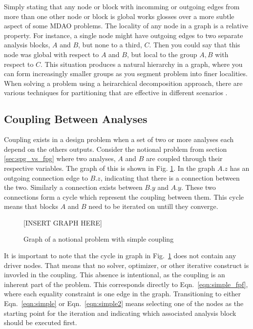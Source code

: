   Simply stating that any node or block with incomming or outgoing edges
  from more than one other node or block is global works glosses over a more 
  subtle aspect of some MDAO problems. The locality of any node in a graph is 
  a relative property. For instance, a single node might have outgoing edges 
  to two separate analysis blocks, $A$ and $B$, but none to a third, $C$. Then 
  you could say that this node was global with respect to $A$ and $B$, but local 
  to the group $A,B$ with respect to $C$. This situation produces a natural 
  hierarchy in a graph, where you can form increasingly smaller groups as you 
  segment problem into finer localities. When solving a problem using 
  a heirarchical decomposition approach, there are various techniques for 
  partitioning that are effective in different scenarios 
  \cite{krishnamachari1997optimal,Perez2004,sobieszczanski1997,allison2009optimal,michelena1997hypergraph}. 

\subsection{Coupling Between Analyses}

  Coupling exists in a design problem when a set of two or more analyses each depend on the
  others outputs. Consider the notional problem from section \ref{sec:spg_vs_fpg} where two 
  analyses, $A$ and $B$ are coupled through their respective variables. The graph of this 
  is shown in Fig. \ref{f:coupling}. In the graph $A.z$ has an outgoing connection 
  edge to $B.z$, indicating that there is a connection between the two. 
  Similarly a connection exists between $B.y$ and $A.y$. These two connections form 
  a cycle which represent the coupling between them. This cycle means that blocks $A$ and $B$ need
  to be iterated on untill they converge. 

  \begin{figure}
      \begin{center}
      [INSERT GRAPH HERE]
      \caption{Graph of a notional problem with simple coupling \label{f:coupling}}
      \end{center}
  \end{figure}

	It is important to note that the cycle in graph in Fig.~\ref{f:coupling} does not contain 
	any driver nodes. That means that no solver, optimizer, or other iterative construct is 
	invovled in the coupling. This absence is intentional, as the coupling is an inherent part 
	of the problem. This corresponds directly to Eqn.~\ref{eqn:simple_fpf}, where 
	each equality constraint is one edge in the graph. Transitioning to either 
	Eqn.~\ref{eqn:simple} or Eqn.~\ref{eqn:simple2} means selecting one of the nodes as the starting point 
	for the iteration and indicating which associated analysis block should be executed first. 

